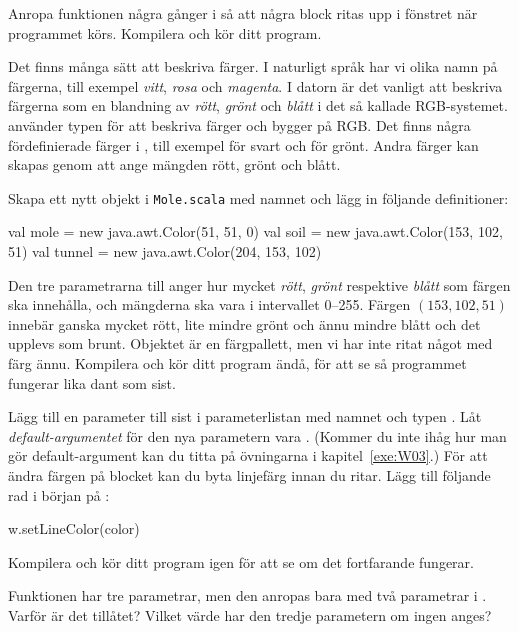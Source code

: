 \Subtask
Anropa funktionen  några gånger i  så att några block ritas upp i fönstret när programmet körs.
Kompilera och kör ditt program.


\Task
Det finns många sätt att beskriva färger.
I naturligt språk har vi olika namn på färgerna, till exempel \emph{vitt}, \emph{rosa} och \emph{magenta}.
I datorn är det vanligt att beskriva färgerna som en blandning av \emph{rött}, \emph{grönt} och \emph{blått} i det så kallade RGB-systemet.
 använder typen  för att beskriva färger och  bygger på RGB.
Det finns några fördefinierade färger i , till exempel  för svart och  för grönt.
Andra färger kan skapas genom att ange mängden rött, grönt och blått.

\Subtask
Skapa ett nytt objekt i \texttt{Mole.scala} med namnet  och lägg in följande definitioner:
\begin{Code}
val mole = new java.awt.Color(51, 51, 0)
val soil = new java.awt.Color(153, 102, 51)
val tunnel = new java.awt.Color(204, 153, 102)
\end{Code}
Den tre parametrarna till  anger hur mycket \emph{rött}, \emph{grönt} respektive \emph{blått} som färgen ska innehålla, och mängderna ska vara i intervallet 0--255.
Färgen $(153, 102, 51)$ innebär ganska mycket rött, lite mindre grönt och ännu mindre blått och det upplevs som brunt.
Objektet  är en färgpallett, men vi har inte ritat något med färg ännu.
Kompilera och kör ditt program ändå, för att se så programmet fungerar lika dant som sist.

\Subtask
Lägg till en parameter till  sist i parameterlistan med namnet  och typen .
Låt \emph{default-argumentet} för den nya parametern vara .
(Kommer du inte ihåg hur man gör default-argument kan du titta på övningarna i kapitel~\ref{exe:W03}.)
För att ändra färgen på blocket kan du byta linjefärg innan du ritar.
Lägg till följande rad i början på :
\begin{Code}
w.setLineColor(color)
\end{Code}
Kompilera och kör ditt program igen för att se om det fortfarande fungerar.

\Subtask\Pen
Funktionen  har tre parametrar, men den anropas bara med två parametrar i .
Varför är det tillåtet?
Vilket värde har den tredje parametern om ingen anges?

